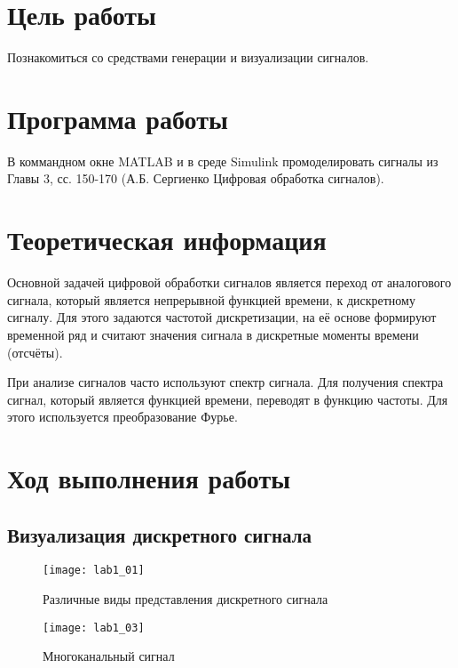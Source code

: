 







\section{Цель работы}

Познакомиться со средствами генерации и визуализации сигналов.
\section{Программа работы}

В коммандном окне MATLAB и в среде Simulink промоделировать сигналы из Главы 3, сс. 150-170 
(А.Б. Сергиенко Цифровая обработка сигналов).
\section{Теоретическая информация}

Основной задачей цифровой обработки сигналов является переход от 
аналогового сигнала, который является непрерывной функцией времени, к
дискретному сигналу. Для этого задаются частотой дискретизации, на её основе 
формируют временной ряд и считают значения сигнала в дискретные моменты времени (отсчёты).

При анализе сигналов часто используют спектр сигнала. Для получения спектра сигнал,
который является функцией времени, переводят в функцию частоты. Для этого используется преобразование Фурье.
\section{Ход выполнения работы}

\subsection{Визуализация дискретного сигнала}
\begin{figure}[H]
	\begin{center}
		\texttt{[image: lab1\_01]}
		\caption{Различные виды представления дискретного сигнала} 
		\label{pic:lab1_01} %
	\end{center}
\end{figure}

\begin{figure}[H]
	\begin{center}
		\texttt{[image: lab1\_03]}
		\caption{Многоканальный сигнал} 
		\label{pic:lab1_03} %
	\end{center}
\end{figure}

